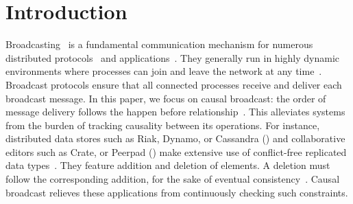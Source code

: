 
\section{Introduction}


Broadcasting~\cite{hadzilacos1994modular} is a fundamental communication
mechanism for numerous distributed
protocols~\cite{nakamoto2009bitcoin,shapiro2011comprehensive} and
applications~\cite{nedelec2016crate}. They generally run in highly dynamic
environments where processes can join and leave the network at any
time~\cite{mostefaoui2005static}. Broadcast protocols ensure that all connected
processes receive and deliver each broadcast message.
In this paper, we focus on causal broadcast: the order of message delivery
follows the happen before
relationship~\cite{lamport1978time,schwarz1994detecting}. This alleviates
systems from the burden of tracking causality between its operations.  For
instance, distributed data stores such as Riak, Dynamo, or Cassandra (\REF) and
collaborative editors such as Crate, or Peerpad (\REF) make extensive use of
conflict-free replicated data
types~\cite{shapiro2011comprehensive,shapiro2011conflict}. They feature addition
and deletion of elements. A deletion must follow the corresponding addition, for
the sake of eventual consistency~\cite{bailis2013eventual}. Causal broadcast
relieves these applications from continuously checking such constraints.

